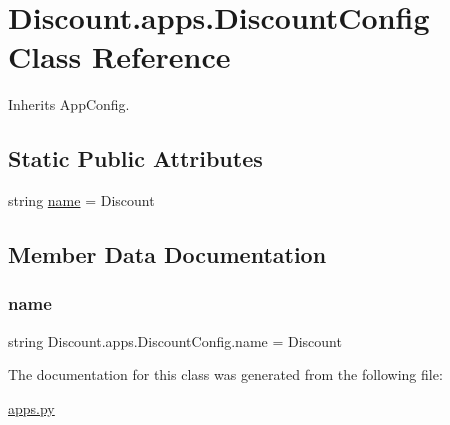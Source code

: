 \hypertarget{class_discount_1_1apps_1_1_discount_config}{}\section{Discount.\+apps.\+Discount\+Config Class Reference}
\label{class_discount_1_1apps_1_1_discount_config}


Inherits App\+Config.

\subsection*{Static Public Attributes}
\begin{DoxyCompactItemize}
\item 
string \hyperlink{class_discount_1_1apps_1_1_discount_config_a3666fd5b63c0e2bf6fe06b1304b3a992}{name} = \textquotesingle{}Discount\textquotesingle{}
\end{DoxyCompactItemize}


\subsection{Member Data Documentation}
\mbox{\label{class_discount_1_1apps_1_1_discount_config_a3666fd5b63c0e2bf6fe06b1304b3a992}} 
\subsubsection{\texorpdfstring{name}{name}}
{\footnotesize\ttfamily string Discount.\+apps.\+Discount\+Config.\+name = \textquotesingle{}Discount\textquotesingle{}\hspace{0.3cm}{\ttfamily [static]}}



The documentation for this class was generated from the following file\+:\begin{DoxyCompactItemize}
\item 
\hyperlink{apps_8py}{apps.\+py}\end{DoxyCompactItemize}
